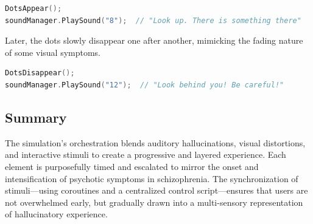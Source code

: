 \begin{lstlisting}[language=C++]
DotsAppear();
soundManager.PlaySound("8");  // "Look up. There is something there"
\end{lstlisting}

Later, the dots slowly disappear one after another, mimicking the fading nature of some visual symptoms.

\begin{lstlisting}[language=C++]
DotsDisappear();
soundManager.PlaySound("12");  // "Look behind you! Be careful!"
\end{lstlisting}


\subsection{Summary}

The simulation's orchestration blends auditory hallucinations, visual distortions, and interactive stimuli to create a progressive and layered experience. Each element is purposefully timed and escalated to mirror the onset and intensification of psychotic symptoms in schizophrenia. The synchronization of stimuli—using coroutines and a centralized control script—ensures that users are not overwhelmed early, but gradually drawn into a multi-sensory representation of hallucinatory experience.



